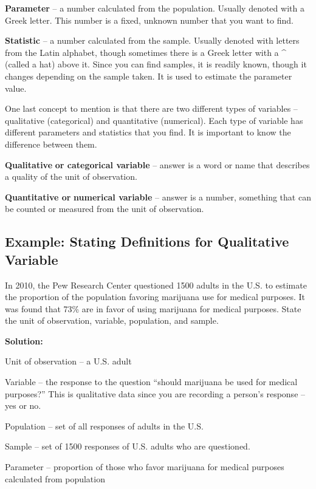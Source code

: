 \documentclass[]{book}
\begin{document}
\textbf{Parameter} -- a number calculated from the population. Usually denoted with a Greek letter. This number is a fixed, unknown number that you want to find.

\textbf{Statistic} -- a number calculated from the sample. Usually denoted with letters from the Latin alphabet, though sometimes there is a Greek letter with a \^{} (called a hat) above it. Since you can find samples, it is readily known, though it changes depending on the sample taken. It is used to estimate the parameter value.

One last concept to mention is that there are two different types of variables -- qualitative (categorical) and quantitative (numerical). Each type of variable has different parameters and statistics that you find. It is important to know the difference between them.

\textbf{Qualitative} \textbf{or categorical variable} -- answer is a word or name that describes a quality of the unit of observation.

\textbf{Quantitative or} \textbf{numerical variable} -- answer is a number, something that can be counted or measured from the unit of observation.

\hypertarget{example-stating-definitions-for-qualitative-variable}{%
\subsection{Example: Stating Definitions for Qualitative Variable}\label{example-stating-definitions-for-qualitative-variable}}

In 2010, the Pew Research Center questioned 1500 adults in the U.S. to estimate the proportion of the population favoring marijuana use for medical purposes. It was found that 73\% are in favor of using marijuana for medical purposes. State the unit of observation, variable, population, and sample.

\textbf{Solution:}

Unit of observation -- a U.S. adult

Variable -- the response to the question ``should marijuana be used for medical purposes?'' This is qualitative data since you are recording a person's response -- yes or no.

Population -- set of all responses of adults in the U.S.

Sample -- set of 1500 responses of U.S. adults who are questioned.

Parameter -- proportion of those who favor marijuana for medical purposes calculated from population
\end{document}
